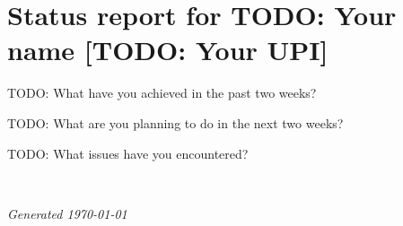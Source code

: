 \documentclass[11pt,a4paper]{article}
\newcommand{\name}{TODO: Your name}
\newcommand{\upi}{TODO: Your UPI}
\begin{document}
\section*{Status report for \name{} [\upi]}

TODO: What have you achieved in the past two weeks?

TODO: What are you planning to do in the next two weeks?

TODO: What issues have you encountered?

~\vfill

\noindent \textit{Generated \today}
\end{document}
